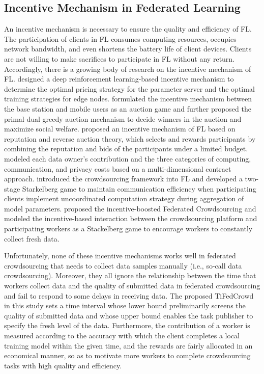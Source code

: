 \documentclass[final,1p,times]{elsarticle}
\begin{document}
\subsection{Incentive Mechanism in Federated Learning}
An incentive mechanism is necessary to ensure the quality and efficiency of FL. The participation of clients in FL consumes computing resources, occupies network bandwidth, and even shortens the battery life of client devices. Clients are not willing to make sacrifices to participate in FL without any return. Accordingly, there is a growing body of research on the incentive mechanism of FL. \cite{zhan2020learn} designed a deep reinforcement learning-based incentive mechanism to determine the optimal pricing strategy for the parameter server and the optimal training strategies for edge nodes. \cite{le2021incentive} formulated the incentive mechanism between the base station and mobile users as an auction game and further proposed the primal-dual greedy auction mechanism to decide winners in the auction and maximize social welfare. \cite{zhang2021incentive} proposed an incentive mechanism of FL based on reputation and reverse auction theory, which selects and rewards participants by combining the reputation and bids of the participants under a limited budget.  \cite{9317806} modeled each data owner's contribution and the three categories of computing, communication, and privacy costs based on a multi-dimensional contract approach. \cite{pandey2019incentivize} introduced the crowdsourcing framework into FL and developed a two-stage Starkelberg game to maintain communication efficiency when participating clients implement uncoordinated computation strategy during aggregation of model parameters. \cite{kang2022incentive} proposed the incentive-boosted Federated Crowdsourcing and modeled the incentive-based interaction between the crowdsourcing platform and participating workers as a Stackelberg game to encourage workers to constantly collect fresh data.

Unfortunately, none of these incentive mechanisms works well in federated crowdsourcing that needs to collect data samples manually (i.e., so-call data crowdsourcing). Moreover, they all ignore the relationship between the time that workers collect data and the quality of submitted data in federated crowdsourcing and fail to respond to some delays in receiving data. The proposed TiFedCrowd in this study sets a time interval whose lower bound preliminarily screens the quality of submitted data and whose upper bound enables the task publisher to specify the fresh level of the data. Furthermore, the contribution of a worker is measured according to the accuracy with which the client completes a local training model within the given time, and the rewards are fairly allocated in an economical manner, so as to motivate more workers to complete crowdsourcing tasks with high quality and efficiency.
\end{document}

